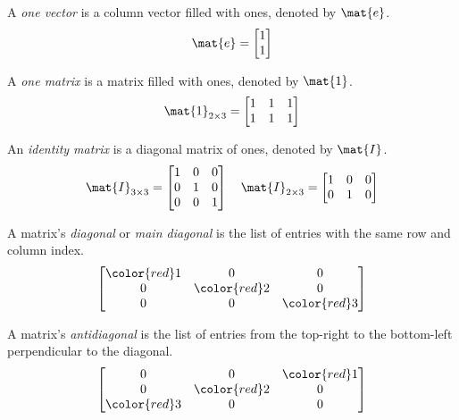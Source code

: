 
A \textit{one vector} is a column vector filled with ones, denoted by $\mat{e}$.
\begin{equation*}
  \mat{e} =
  \begin{bmatrix}
    1 \\
    1
  \end{bmatrix}
\end{equation*}

A \textit{one matrix} is a matrix filled with ones, denoted by $\mat{1}$.
\begin{equation*}
  \mat{1}_{2 \times 3} =
  \begin{bmatrix}
    1 & 1 & 1 \\
    1 & 1 & 1
  \end{bmatrix}
\end{equation*}

An \textit{identity matrix} is a diagonal matrix of ones, denoted by $\mat{I}$.
\begin{equation*}
  \mat{I}_{3 \times 3} =
  \begin{bmatrix}
    1 & 0 & 0 \\
    0 & 1 & 0 \\
    0 & 0 & 1
  \end{bmatrix}
  \quad
  \mat{I}_{2 \times 3} =
  \begin{bmatrix}
    1 & 0 & 0 \\
    0 & 1 & 0
  \end{bmatrix}
\end{equation*}

A matrix's \textit{diagonal} or \textit{main diagonal} is the list of entries
with the same row and column index.
\begin{equation*}
  \begin{bmatrix}
    {\color{red}1} & 0 & 0 \\
    0 & {\color{red}2} & 0 \\
    0 & 0 & {\color{red}3}
  \end{bmatrix}
\end{equation*}

A matrix's \textit{antidiagonal} is the list of entries from the top-right to
the bottom-left perpendicular to the diagonal.
\begin{equation*}
  \begin{bmatrix}
    0 & 0 & {\color{red}1} \\
    0 & {\color{red}2} & 0 \\
    {\color{red}3} & 0 & 0
  \end{bmatrix}
\end{equation*}

